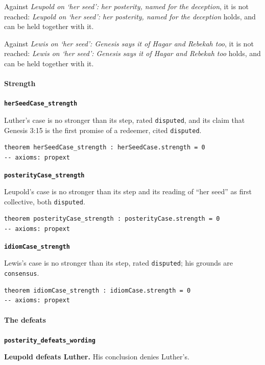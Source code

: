 \documentclass[11pt]{article}
\begin{document}
Against \emph{Leupold on ‘her seed’: her posterity, named for the deception}, it is not reached: \emph{Leupold on ‘her seed’: her posterity, named for the deception} holds, and can be held together with it.

Against \emph{Lewis on ‘her seed’: Genesis says it of Hagar and Rebekah too}, it is not reached: \emph{Lewis on ‘her seed’: Genesis says it of Hagar and Rebekah too} holds, and can be held together with it.

\paragraph*{Strength}
\leavevmode\par\nobreak
\par\medskip\noindent\textbf{\texttt{her\allowbreak{}Seed\allowbreak{}Case\_\allowbreak{}strength}}\par\nobreak\noindent
Luther’s case is no stronger than its step, rated \texttt{disputed}, and its claim that Genesis 3:15 is the first promise of a redeemer, cited \texttt{disputed}.

{\small\begin{verbatim}
theorem herSeedCase_strength : herSeedCase.strength = 0
-- axioms: propext
\end{verbatim}}
\par\medskip\noindent\textbf{\texttt{posterity\allowbreak{}Case\_\allowbreak{}strength}}\par\nobreak\noindent
Leupold’s case is no stronger than its step and its reading of “her seed” as first collective, both \texttt{disputed}.

{\small\begin{verbatim}
theorem posterityCase_strength : posterityCase.strength = 0
-- axioms: propext
\end{verbatim}}
\par\medskip\noindent\textbf{\texttt{idiom\allowbreak{}Case\_\allowbreak{}strength}}\par\nobreak\noindent
Lewis’s case is no stronger than its step, rated \texttt{disputed}; his grounds are \texttt{consensus}.

{\small\begin{verbatim}
theorem idiomCase_strength : idiomCase.strength = 0
-- axioms: propext
\end{verbatim}}
\paragraph*{The defeats}
\leavevmode\par\nobreak
\par\medskip\noindent\textbf{\texttt{posterity\_\allowbreak{}defeats\_\allowbreak{}wording}}\par\nobreak\noindent
\textbf{Leupold defeats Luther.} His conclusion denies Luther’s.
\end{document}
